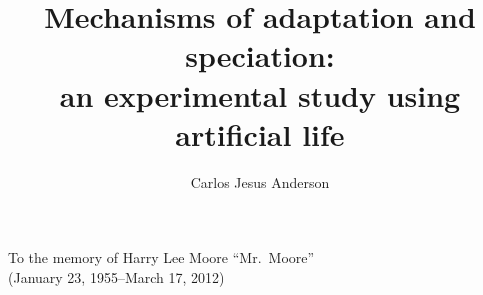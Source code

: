 \documentclass{msuphddissertation}
\title{Mechanisms of adaptation and speciation:\protect\\
  an experimental study using artificial life}
\author{Carlos Jesus Anderson}
\begin{document}
\maketitlepage



\begin{dedication} 
\centering To the memory of Harry Lee Moore ``Mr.\ Moore''\\
  (January 23, 1955--March 17, 2012)
\end{dedication}



\TOC
\LOT
\LOF

\newpage
{}










\end{document}

